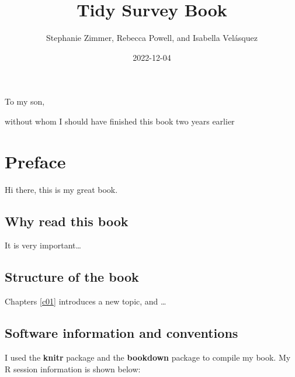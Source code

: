 \documentclass[
]{krantz}
\title{Tidy Survey Book}
\author{Stephanie Zimmer, Rebecca Powell, and Isabella Velásquez}
\date{2022-12-04}
\begin{document}
\maketitle


\thispagestyle{empty}

\begin{center}
To my son,

without whom I should have finished this book two years earlier
\end{center}

\setlength{\abovedisplayskip}{-5pt}
\setlength{\abovedisplayshortskip}{-5pt}

{
\hypersetup{linkcolor=}
\setcounter{tocdepth}{2}
\tableofcontents
}
\listoffigures
\listoftables
\hypertarget{preface}{%
\chapter*{Preface}\label{preface}}


Hi there, this is my great book.

\hypertarget{why-read-this-book}{%
\section*{Why read this book}\label{why-read-this-book}}


It is very important\ldots{}

\hypertarget{structure-of-the-book}{%
\section*{Structure of the book}\label{structure-of-the-book}}


Chapters \ref{c01} introduces a new topic, and \ldots{}

\hypertarget{software-information-and-conventions}{%
\section*{Software information and conventions}\label{software-information-and-conventions}}


I used the \textbf{knitr} package \citep{xie2015} and the \textbf{bookdown} package \citep{R-bookdown} to compile my book. My R session information is shown below:
\end{document}
